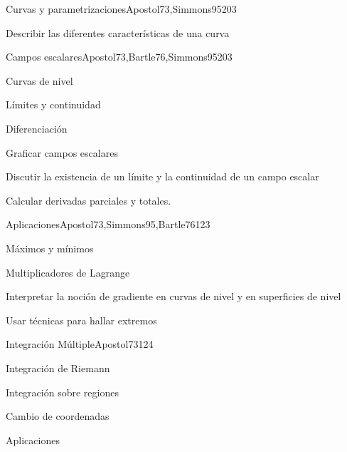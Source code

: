 \begin{syllabus}
\begin{unit}{Curvas y parametrizaciones}{}{Apostol73,Simmons95}{20}{3}
   \begin{learningoutcomes}
      \item Describir las diferentes características de una curva
      \end{learningoutcomes}
\end{unit}

\begin{unit}{Campos escalares}{}{Apostol73,Bartle76,Simmons95}{20}{3}
   \begin{topics}
      \item Curvas de nivel
      \item Límites y continuidad
      \item Diferenciación
      \end{topics}

   \begin{learningoutcomes}
      \item Graficar campos escalares
      \item Discutir la existencia de un límite y la continuidad de un campo escalar
      \item Calcular derivadas parciales y totales.
      \end{learningoutcomes}
\end{unit}

\begin{unit}{Aplicaciones}{}{Apostol73,Simmons95,Bartle76}{12}{3}
   \begin{topics}
      \item Máximos y mínimos
      \item Multiplicadores de Lagrange
      \end{topics}

   \begin{learningoutcomes}
      \item Interpretar la noción de gradiente en curvas de nivel y en superficies de nivel
      \item Usar técnicas para hallar extremos
      \end{learningoutcomes}
\end{unit}

\begin{unit}{Integración Múltiple}{}{Apostol73}{12}{4}
   \begin{topics}
      \item Integración de Riemann
      \item Integración sobre regiones
      \item Cambio de coordenadas
      \item Aplicaciones
      \end{topics}


\end{unit}
\end{syllabus}
